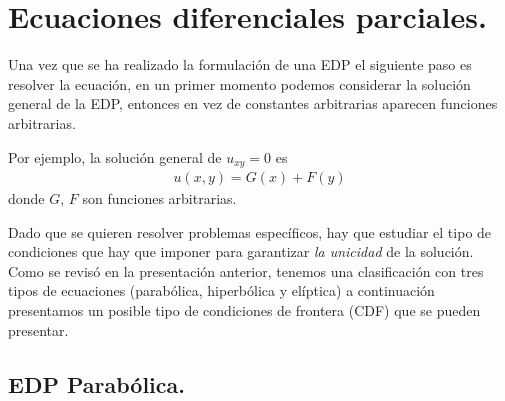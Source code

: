 \section{Ecuaciones diferenciales parciales.}

Una vez que se ha realizado la formulación de una EDP el siguiente paso es resolver la ecuación, en un primer momento podemos considerar la solución general de la EDP, entonces en vez de constantes arbitrarias aparecen funciones arbitrarias.
\par
Por ejemplo, la solución general de $u_{xy} = 0$ es 
\begin{align*}
u (x, y) = G (x) + F (y)
\end{align*}
donde $G$, $F$ son funciones arbitrarias.
\par
Dado que se quieren resolver problemas específicos, hay que estudiar el tipo de condiciones que hay que imponer para garantizar \emph{la unicidad} de la solución. Como se revisó en la presentación anterior, tenemos una clasificación con tres tipos de ecuaciones (parabólica, hiperbólica y elíptica) a continuación presentamos un posible tipo de condiciones de frontera (CDF) que se pueden presentar.

\subsection{EDP Parabólica.}

